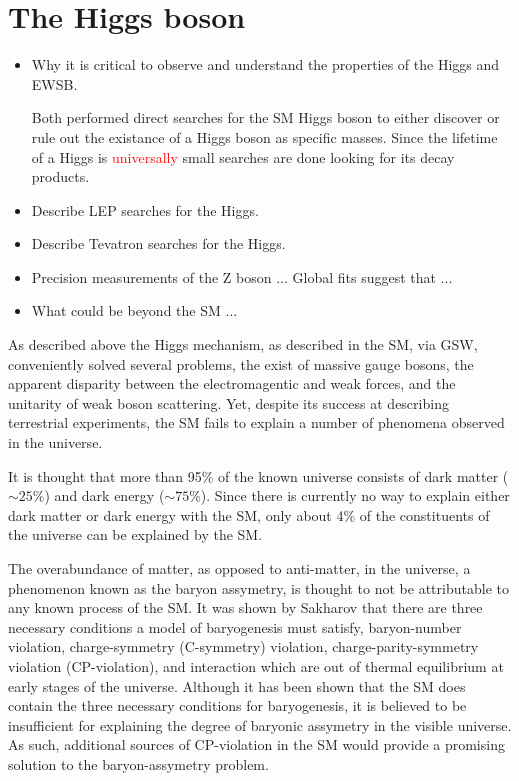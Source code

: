 \section{The Higgs boson}
\label{sec:The Higgs boson}

\begin{itemize}
\item Why it is critical to observe and understand the properties of the Higgs
and EWSB.

Both performed direct searches for the SM Higgs boson to either 
discover or rule out the existance of a Higgs boson as specific
masses.  Since the lifetime of a Higgs is \textcolor{red}{universally}
small searches are done looking for its decay products.  

\item Describe LEP searches for the Higgs.

\item Describe Tevatron searches for the Higgs.

\item Precision measurements of the Z boson ...
Global fits suggest that ... 

\item What could be beyond the SM ...

\end{itemize}


As described above the Higgs mechanism, as described in the SM, via GSW, 
conveniently solved several problems, the exist of massive gauge bosons,
the apparent disparity between the electromagentic and weak forces, and 
the unitarity of weak boson scattering. Yet, despite its success at 
describing terrestrial experiments, the SM fails 
to explain a number of phenomena observed in the universe.
  
It is thought that more than 95\% of the known universe consists of dark 
matter ($\sim25$\%) and dark energy ($\sim75$\%)\cite{??}.  Since there is 
currently no way to explain either dark matter or dark energy with the SM, 
only about 4\% of the constituents of the universe can be explained by the 
SM.  

The overabundance of matter, as opposed to anti-matter, in the 
universe, a phenomenon known as the baryon assymetry, is thought to not be 
attributable to any known process of the SM.
It was shown by Sakharov\cite{??} that there are three necessary conditions 
a model of baryogenesis must satisfy, baryon-number violation, 
charge-symmetry (C-symmetry) violation, charge-parity-symmetry violation 
(CP-violation), and interaction which are out of thermal equilibrium at early
stages of the universe.  Although it has been shown that the SM does
contain the three necessary conditions for baryogenesis, it is believed
to be insufficient for explaining the degree of baryonic assymetry in the 
visible universe.  As such, additional sources of CP-violation in the SM 
would provide a promising solution to the baryon-assymetry problem.  

